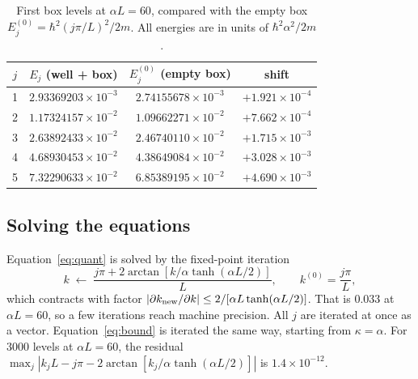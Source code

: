 \documentclass[11pt]{article}
\numberwithin{equation}{section}
\begin{document}
\begin{table}[h]
\centering
\caption{First box levels at $\alpha L=60$, compared with the empty box $E_j^{(0)}=\hbar^2(j\pi/L)^2/2m$. All energies are in units of $\hbar^2\alpha^2/2m$.}
\label{tab:levels}
\begin{tabular}{cccc}
\toprule
$j$ & $E_j$ (well + box) & $E_j^{(0)}$ (empty box) & shift\\
\midrule
1 & $2.93369203\times10^{-3}$ & $2.74155678\times10^{-3}$ & $+1.921\times10^{-4}$\\
2 & $1.17324157\times10^{-2}$ & $1.09662271\times10^{-2}$ & $+7.662\times10^{-4}$\\
3 & $2.63892433\times10^{-2}$ & $2.46740110\times10^{-2}$ & $+1.715\times10^{-3}$\\
4 & $4.68930453\times10^{-2}$ & $4.38649084\times10^{-2}$ & $+3.028\times10^{-3}$\\
5 & $7.32290633\times10^{-2}$ & $6.85389195\times10^{-2}$ & $+4.690\times10^{-3}$\\
\bottomrule
\end{tabular}
\end{table}

\subsection{Solving the equations}
Equation~\eqref{eq:quant} is solved by the fixed-point iteration
\begin{equation}
k\;\leftarrow\;\frac{j\pi+2\arctan[k/\alpha\tanh(\alpha L/2)]}{L},\qquad k^{(0)}=\frac{j\pi}{L},
\end{equation}
which contracts with factor $|\partial k_{\rm new}/\partial k|\le2/[\alpha L\tanh(\alpha L/2)]$. That is $0.033$ at $\alpha L=60$, so a few iterations reach machine precision. All $j$ are iterated at once as a vector. Equation~\eqref{eq:bound} is iterated the same way, starting from $\kappa=\alpha$. For 3000 levels at $\alpha L=60$, the residual $\max_j|k_jL-j\pi-2\arctan[k_j/\alpha\tanh(\alpha L/2)]|$ is $1.4\times10^{-12}$.
\end{document}
